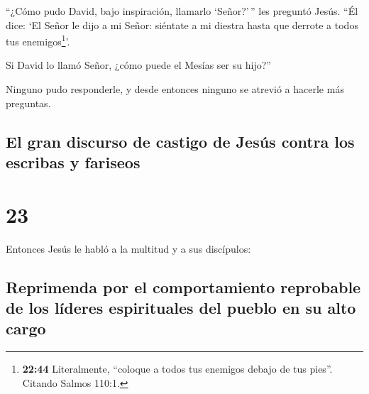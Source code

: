  ``¿Cómo pudo David, bajo inspiración, llamarlo
`Señor?'\,'' les preguntó Jesús. ``Él dice:  `El Señor le
dijo a mi Señor: siéntate a mi diestra hasta que derrote a todos tus
enemigos\footnote{\textbf{22:44} Literalmente, ``coloque a todos tus
  enemigos debajo de tus pies''. Citando Salmos 110:1.}'.

 Si David lo llamó Señor, ¿cómo puede el Mesías ser su
hijo?''

 Ninguno pudo responderle, y desde entonces ninguno se
atrevió a hacerle más preguntas.

\hypertarget{el-gran-discurso-de-castigo-de-jesuxfas-contra-los-escribas-y-fariseos}{%
\subsection{El gran discurso de castigo de Jesús contra los escribas y
fariseos}\label{el-gran-discurso-de-castigo-de-jesuxfas-contra-los-escribas-y-fariseos}}

\hypertarget{section-22}{%
\section{23}\label{section-22}}

 Entonces Jesús le habló a la multitud y a sus discípulos:

\hypertarget{reprimenda-por-el-comportamiento-reprobable-de-los-luxedderes-espirituales-del-pueblo-en-su-alto-cargo}{%
\subsection{Reprimenda por el comportamiento reprobable de los líderes
espirituales del pueblo en su alto
cargo}\label{reprimenda-por-el-comportamiento-reprobable-de-los-luxedderes-espirituales-del-pueblo-en-su-alto-cargo}}

